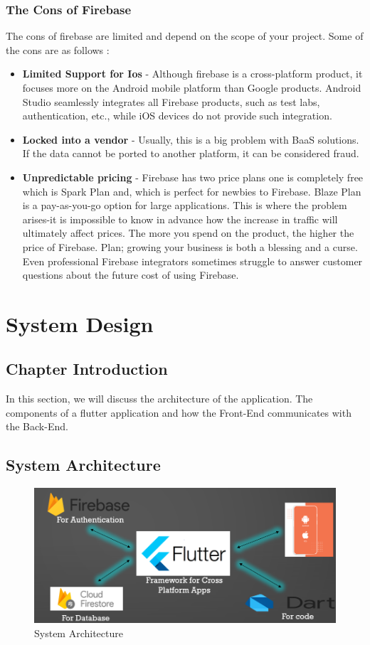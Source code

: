 \subsection{The Cons of Firebase}
The cons of firebase are limited and depend on the scope of your project. Some of the cons are as follows \cite{Downsidefirebase:online}:
\begin{itemize}
    \item \textbf{Limited Support for Ios} - Although firebase is a cross-platform product, it focuses more on the Android mobile platform than Google products. Android Studio seamlessly integrates all Firebase products, such as test labs, authentication, etc., while iOS devices do not provide such integration.
    \item \textbf{Locked into a vendor} - Usually, this is a big problem with BaaS solutions. If the data cannot be ported to another platform, it can be considered fraud.
    \item \textbf{Unpredictable pricing} - Firebase has two price plans one is completely free which is Spark Plan and, which is perfect for newbies to Firebase. Blaze Plan is a pay-as-you-go option for large applications. This is where the problem arises-it is impossible to know in advance how the increase in traffic will ultimately affect prices. The more you spend on the product, the higher the price of Firebase. Plan; growing your business is both a blessing and a curse. Even professional Firebase integrators sometimes struggle to answer customer questions about the future cost of using Firebase.
\end{itemize}

\chapter{System Design}

\section{Chapter Introduction}
In this section, we will discuss the architecture of the application. The
components of a flutter application and how the Front-End communicates with the Back-End.

\section{System Architecture}
\begin{figure}[!htb]
    \centering
    \includegraphics[scale=0.70]{img/systemArchitecture.PNG}
    \caption{System Architecture}
    \label{fig:System Architecture}
\end{figure}

